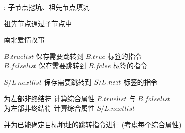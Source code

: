\begin{frame}{}
  \begin{center}
    : {子节点挖坑、祖先节点填坑}


    \pause
    \vspace{0.80cm}
    祖先节点通过子节点中
  \end{center}
\end{frame}

\begin{frame}{}
  \begin{center}
    南北爱情故事

  \end{center}
\end{frame}

\begin{frame}{}
\end{frame}

\begin{frame}{}
\end{frame}

\begin{frame}{}
  \begin{center}
    {$B.\mathit{truelist}$ 保存{需要跳转到 $B.\mathit{true}$ 标签}的{指令}} \\[5pt]
    {$B.\mathit{falselist}$ 保存{需要跳转到 $B.\mathit{false}$ 标签}的{指令}}


    {$S/L.\mathit{nextlist}$} 保存{需要跳转到 $S/L.\mathit{next}$ 标签的指令}
  \end{center}
\end{frame}

\begin{frame}{}
  \begin{center}
    为左部非终结符  计算综合属性 $B.\mathit{truelist}$ 与 $B.\mathit{falselist}$ \\[5pt]
    为左部非终结符  计算综合属性 $S/L.\mathit{nextlist}$


    并为已能确定目标地址的跳转指令进行 (考虑每个综合属性)
  \end{center}
\end{frame}
